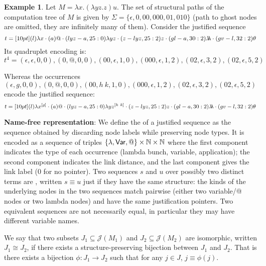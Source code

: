 \documentclass{article}
\theoremstyle{plain}
\theoremstyle{definition}
\newtheorem{example}{Example}[section]
\theoremstyle{remark}
\newcommand{\ghostlmd}{{\lambda\!\!\lambda}}
\newcommand{\ghostvar}{\theta}
\def\justseqset{\mathcal{J}}
\begin{document}
\begin{example}
\label{examp:ghost_materialization}
    Let $M = \lambda x. (\lambda y z.z) u$. The set of structural paths of the computation tree of $M$ is given by $\Sigma = \{\epsilon, 0, 00,000, 01,010\}$ (path to ghost nodes are omitted, they are infinitely many of them).
    Consider the justified sequence
    $$t = \Pstr[10pt]{
        (l){\lambda x} \cdot (a)@ \cdot (lyz-a,25:0){\lambda y z} \cdot (z-lyz,25:2)z \cdot (gl-a,30:2)\ghostlmd \cdot (gv-l,32:2)\ghostvar }
    $$
    Its quadruplet encoding is:
    $$ t^4= (\epsilon, \epsilon ,0,0), (0,@,0,0), (00, \epsilon, 1,0), (000,\epsilon, 1,2), (02,\epsilon,3,2), (02,\epsilon,5,2) $$

    Whereas the occurrences $ (\epsilon, g ,0,0), (0,@,0,0), (00, h~k, 1,0), (000,\epsilon, 1,2), (02,\epsilon,3,2), (02,\epsilon,5,2) $ encode the justified sequence:
    $$t = \Pstr[10pt]{
        (l){\lambda x^{[g]}} \cdot (a)@ \cdot (lyz-a,25:0){\lambda y z^{[h~k]}} \cdot (z-lyz,25:2)z \cdot (gl-a,30:2)\ghostlmd \cdot (gv-l,32:2)\ghostvar }
    $$
\end{example}

{\bf Name-free representation}: We define the  of a justified sequence as the sequence obtained by discarding node labels while preserving node types. It is encoded as a sequence of triples $\{\lambda, {\sf Var}, @ \}\times\mathbb{N}\times\mathbb{N}$ where the first component indicates the type of each occurrence (lambda bunch, variable, application); the second component indicates the link distance, and the last component gives the link label ($0$ for no pointer).
Two sequences $s$ and $u$ over possibly two distinct terms are , written $s \equiv u$ just if they have the same structure: the kinds of the underlying nodes in the two sequences match pairwise (either two variable/@ nodes or two lambda nodes) and have the same justification pointers. Two equivalent sequences are not necessarily equal, in particular they may have different variable names.

We say that two subsets $J_1\subseteq \justseqset(M_1)$ and $J_2\subseteq\justseqset(M_2)$ are isomorphic, written $J_1\cong J_2$, if  there exists a structure-preserving bijection between $J_1$ and $J_2$. That is there exists a bijection $\phi :J_1\longrightarrow J_2$ such that for any $j\in J$, $j\equiv\phi(j)$.
\end{document}
